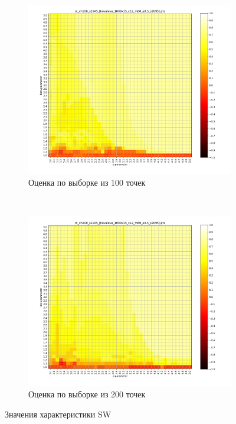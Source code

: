 \documentclass[12pt,twoside,a4paper,tikz,border=5]{refart}
\begin{document}
\begin{figure}[t!]
		\begin{subfigure}[t]{0.5\textwidth}
			\centering
			\includegraphics[width=1\linewidth, trim=1.4cm 1cm 2cm 0.5cm, clip]{img/sw/12/kovaleva_1000x15_c12_m60_a0.5_s2095/100/rc_ch100_s2945_[kovaleva_1000x15_c12_m60_a0.5_s2095].png}
			\caption{Оценка по выборке из 100 точек} \label{fig:sw-100}
		\end{subfigure}%
		~
		\begin{subfigure}[t]{0.5\textwidth}
			\centering
			\includegraphics[width=1\linewidth, trim=1.4cm 1cm 2cm 0.5cm, clip]{img/sw/12/kovaleva_1000x15_c12_m60_a0.5_s2095/200/rc_ch200_s2945_[kovaleva_1000x15_c12_m60_a0.5_s2095].png}
			\caption{Оценка по выборке из 200 точек} \label{fig:sw-200}
		\end{subfigure}
		\caption{Значения характеристики SW} \label{fig:sw}
	\end{figure}
	
\end{document}
